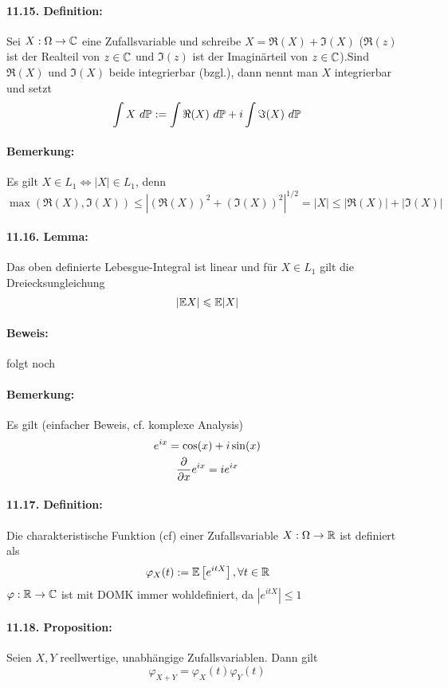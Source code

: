 \documentclass[11pt]{report}
\begin{document}
\paragraph{11.15. Definition:} Sei $X:\Omega\to\mathbb{C}$ eine Zufallsvariable und schreibe $X=\Re(X)+\Im(X)$ ($\Re(z)$ ist der Realteil von $z\in\mathbb{C}$ und $\Im(z)$ ist der Imagin\"arteil von $z\in\mathbb{C}$).Sind $\Re(X)$ und $\Im(X)$ beide integrierbar (bzgl.), dann nennt man $X$ integrierbar und setzt
$$\int X\ d\Pp:=\int\Re(X)\ d\Pp+i\int\Im(X)\ d\Pp$$
\paragraph{Bemerkung:} Es gilt $X\in L_1\iff |X|\in L_1$, denn
$$\max(\Re(X),\Im(X))\leq|(\Re(X))^2+(\Im(X))^2|^{1/2}=|X|\leq|\Re(X)|+|\Im(X)|$$

\paragraph{11.16. Lemma:} Das oben definierte Lebesgue-Integral ist linear und f\"ur $X\in L_1$ gilt die Dreiecksungleichung
$$|\mathbb{E} X|\leqslant\mathbb{E}|X|$$

\paragraph{Beweis:} folgt noch %

\paragraph{Bemerkung:} Es gilt (einfacher Beweis, cf. komplexe Analysis)
\begin{gather*}
    e^{ix}=\cos(x)+i\sin(x) \\
    \dfrac{\partial}{\partial x}e^{ix}=ie^{ix}
\end{gather*}
 
\paragraph{11.17. Definition:} Die charakteristische Funktion (cf) einer Zufallsvariable $X:\Omega\to\mathbb{R}$ ist definiert als
$$\varphi_X(t):=\mathbb{E} \left[e^{itX}\right],\forall t\in\mathbb{R}$$
$\varphi:\mathbb{R}\to\mathbb{C}$ ist mit DOMK immer wohldefiniert, da $\left|e^{itX}\right|\leq1$

\paragraph{11.18. Proposition:} Seien $X,Y$ reellwertige, unabh\"angige Zufallsvariablen. Dann gilt
$$\varphi_{X+Y}=\varphi_X(t)\varphi_Y(t)$$
\end{document}
